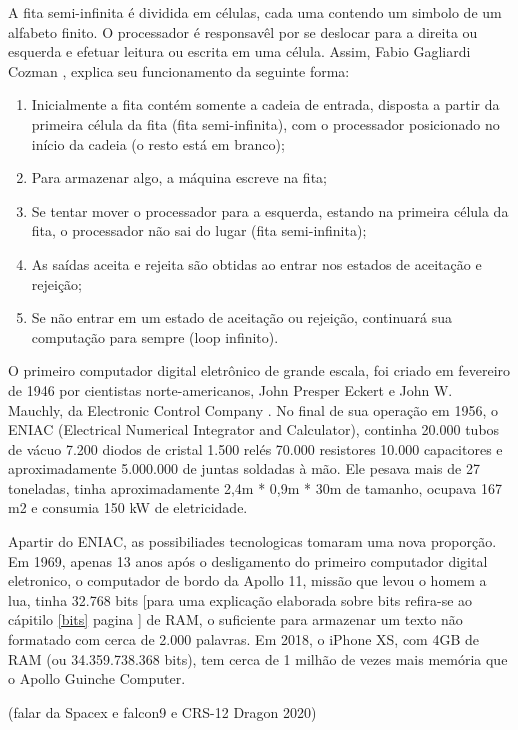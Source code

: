 A fita semi-infinita é dividida em células, cada uma contendo um simbolo de um alfabeto finito. O processador é responsavêl por se deslocar para a direita ou esquerda e efetuar leitura ou escrita em uma célula. Assim, Fabio Gagliardi Cozman \cite{7}, explica seu funcionamento da seguinte forma:
\begin{enumerate}
  \item Inicialmente a fita contém somente a cadeia de entrada, disposta a partir da primeira célula da fita (fita semi-infinita), com o processador posicionado no início da cadeia (o resto está em branco);
  \item Para armazenar algo, a máquina escreve na fita;
  \item Se tentar mover o processador para a esquerda, estando na primeira célula da fita, o processador não sai do lugar (fita semi-infinita);
  \item As saídas aceita e rejeita são obtidas ao entrar nos estados de aceitação e rejeição;
  \item Se não entrar em um estado de aceitação ou rejeição, continuará sua computação para sempre (loop infinito).
\end{enumerate}

O primeiro computador digital eletrônico de grande escala, foi criado em fevereiro de 1946 por cientistas norte-americanos, John Presper Eckert e John W. Mauchly, da Electronic Control Company . No final de sua operação em 1956, o ENIAC (Electrical Numerical Integrator and Calculator), continha 20.000 tubos de vácuo 7.200 diodos de cristal 1.500 relés 70.000 resistores 10.000 capacitores e aproximadamente 5.000.000 de juntas soldadas à mão. Ele pesava mais de 27 toneladas, tinha aproximadamente 2,4m * 0,9m * 30m de tamanho, ocupava 167 m2 e consumia 150 kW de eletricidade. \cite{2}

Apartir do ENIAC, as possibiliades tecnologicas tomaram uma nova proporção. Em 1969, apenas 13 anos após o desligamento do primeiro computador digital eletronico, o computador de bordo da Apollo 11, missão que levou o homem a lua, tinha 32.768 bits [para uma explicação elaborada sobre bits refira-se ao cápitilo \ref{bits} pagina \pageref{bits}] de RAM, o suficiente para armazenar um texto não formatado com cerca de 2.000 palavras. Em 2018, o iPhone XS, com 4GB de RAM (ou 34.359.738.368 bits), tem cerca de 1 milhão de vezes mais memória que o Apollo Guinche Computer. \cite{5}

(falar da Spacex e falcon9 e CRS-12 Dragon 2020)

